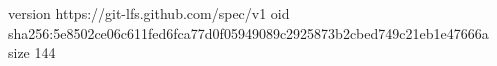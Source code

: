 version https://git-lfs.github.com/spec/v1
oid sha256:5e8502ce06c611fed6fca77d0f05949089c2925873b2cbed749c21eb1e47666a
size 144
